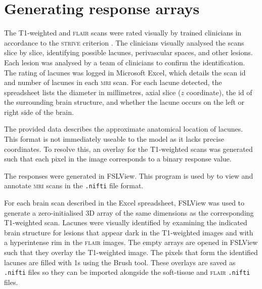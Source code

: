 
\section{Generating response arrays}\label{data-lacune}

The T1-weighted and \textsc{flair} scans were rated visually by trained clinicians in accordance to the \textsc{strive} criterion \cite{WardlawJ.M.2013Nsfr}. The clinicians visually analysed the scans slice by slice, identifying possible lacunes, perivascular spaces, and other lesions. Each lesion was analysed by a team of clinicians to confirm the identification. The rating of lacunes was logged in Microsoft Excel, which details the scan id and number of lacunes in each \textsc{mri} scan. For each lacune detected, the spreadsheet lists the diameter in millimetres, axial slice ($z$ coordinate), the id of the surrounding brain structure, and whether the lacune occurs on the left or right side of the brain.


The provided data describes the approximate anatomical location of lacunes. This format is not immediately useable to the model as it lacks precise coordinates. To resolve this, an overlay for the T1-weighted scans was generated such that each pixel in the image corresponds to a binary response value.

The responses were generated in FSLView. This program is used by to view and annotate \textsc{mri} scans in the \texttt{.nifti} file format.

For each brain scan described in the Excel spreadsheet, FSLView was used to generate a zero-initialised 3D array of the same dimensions as the corresponding T1-weighted scan. Lacunes were visually identified by examining the indicated brain structure for lesions that appear dark in the T1-weighted images and with a hyperintense rim in the \textsc{flair} images. The empty arrays are opened in FSLView such that they overlay the T1-weighted image. The pixels that form the identified lacunes are filled with 1s using the Brush tool. These overlays are saved as \texttt{.nifti} files so they can be imported alongside the soft-tissue and \textsc{flair} \texttt{.nifti} files.

